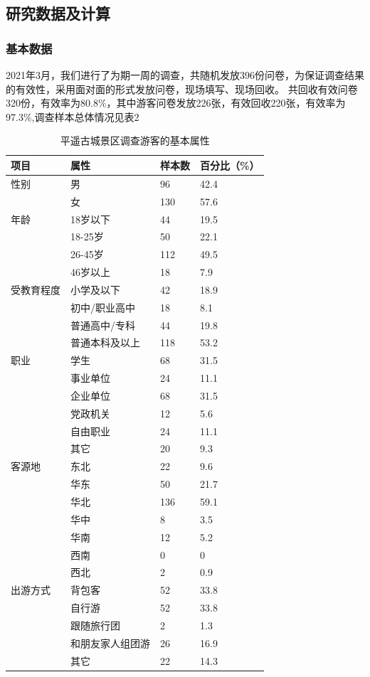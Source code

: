 \documentclass[UTF8]{ctexart}
\begin{document}
    \subsection{研究数据及计算}
        \subsubsection{基本数据}
            2021年3月，我们进行了为期一周的调查，共随机发放396份问卷，为保证调查结果的有效性，采用面对面的形式发放问卷，现场填写、现场回收。
            共回收有效问卷320份，有效率为80.8\%，其中游客问卷发放226张，有效回收220张，有效率为97.3\%,调查样本总体情况见表2
\begin{table}[H]
\centering
\caption{平遥古城景区调查游客的基本属性}
\begin{tabular}{p{2.5cm}p{3cm}p{2cm}p{2cm}}
    \toprule
    项目 & 属性 & 样本数 & 百分比（\%）\\ 
    \midrule
    性别&男 &96 & 42.4 \\
    & 女&130 &  57.6\\
    \cmidrule{1-4}
    年龄& 18岁以下& 44 &19.5  \\
    &18-25岁&50 & 22.1  \\
    &26-45岁&112 & 49.5  \\
    &46岁以上&18 &  7.9 \\
    \cmidrule{1-4}
    受教育程度& 小学及以下&42 &18.9 \\
    &初中/职业高中& 18&8.1   \\
    &普通高中/专科&44& 19.8 \\
    &普通本科及以上&118 & 53.2  \\
    \cmidrule{1-4}
    职业&学生&68&31.5\\
    &事业单位&24&11.1\\
    &企业单位&68&31.5\\
    &党政机关&12&5.6\\
    &自由职业&24&11.1\\
    &其它&20&9.3\\
    \cmidrule{1-4}
    客源地&东北&22&9.6\\
    &华东&50&21.7\\
    &华北&136&59.1\\
    &华中&8&3.5\\
    &华南&12&5.2\\
    &西南&0&0\\
    &西北&2&0.9\\
    \cmidrule{1-4}
    出游方式&背包客&52&33.8\\
    &自行游&52&33.8\\
    &跟随旅行团&2&1.3\\
    &和朋友家人组团游&26&16.9\\
    &其它&22&14.3\\
    \bottomrule
\end{tabular}
\end{table}
\end{document}
